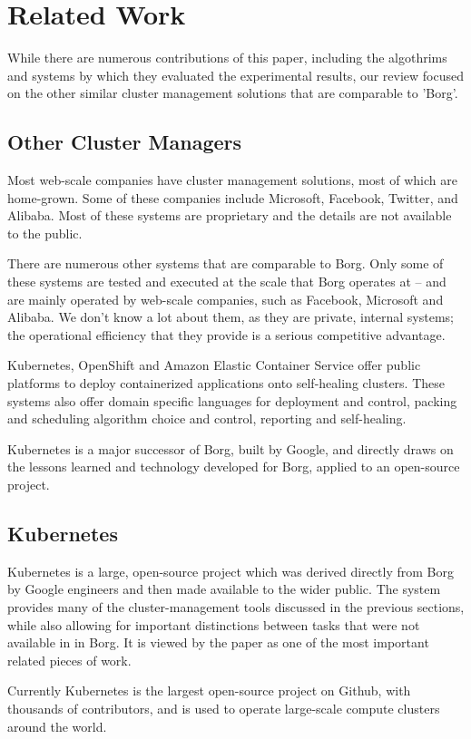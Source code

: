 \documentclass[runningheads,a4paper]{llncs}
\begin{document}
\section{Related Work}
While there are numerous contributions of this paper, including the algothrims and systems by which they evaluated the experimental results, our review focused on the other similar cluster management solutions that are comparable to 'Borg'.

\subsection{Other Cluster Managers}
Most web-scale companies have cluster management solutions, most of which are home-grown.  Some of these companies include Microsoft, Facebook, Twitter, and Alibaba.  Most of these systems are proprietary and the details are not available to the public.  

There are numerous other systems that are comparable to Borg.
Only some of these systems are tested and executed at the scale that Borg operates at -- and are mainly operated by web-scale companies, such as Facebook, Microsoft and Alibaba.  We don’t know a lot about them, as they are private, internal systems; the operational efficiency that they provide is a serious competitive advantage.

Kubernetes, OpenShift and Amazon Elastic Container Service offer public platforms to deploy containerized applications onto self-healing clusters.  These systems also offer domain specific languages for deployment and control, packing and scheduling algorithm choice and control, reporting and self-healing. 

Kubernetes is a major successor of Borg, built by Google, and directly draws on the lessons learned and technology developed for Borg, applied to an open-source project.  

\subsection{Kubernetes}
Kubernetes is a large, open-source project which was derived directly from Borg by Google engineers and then made available to the wider public.  The system provides many of the cluster-management tools discussed in the previous sections, while also allowing for important distinctions between tasks that were not available in in Borg.  It is viewed by the paper as one of the most important related pieces of work.

Currently Kubernetes is the largest open-source project on Github, with thousands of contributors, and is used to operate large-scale compute clusters around the world.
\end{document}
